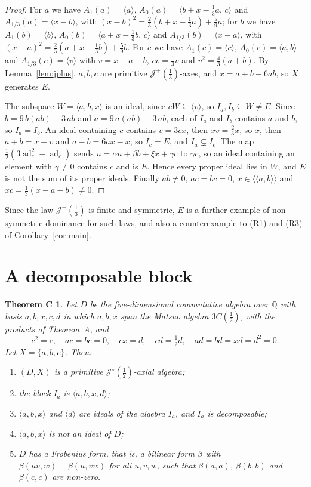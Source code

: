 \documentclass[11pt]{article}
\newif\ifwithC
\newtheorem*{thmC}{Theorem C}
\theoremstyle{definition}
\theoremstyle{remark}
\newcommand{\Q}{\mathbb Q}
\newcommand{\cJ}{\mathcal J}
\newcommand{\Jp}{\cJ^{+}}
\newcommand{\Jo}{\cJ^{\circ}}
\newcommand{\lla}{\langle\!\langle}
\newcommand{\rra}{\rangle\!\rangle}
\newcommand{\ad}{\operatorname{ad}}
\newcommand{\half}{\tfrac12}
\newcommand{\third}{\tfrac13}
\begin{document}
\begin{proof}
For $a$ we have $A_1(a)=\langle a\rangle$, $A_0(a)=\langle
b+x-\third a,\,c\rangle$ and $A_{1/3}(a)=\langle x-b\rangle$, with
$(x-b)^2=\frac23(b+x-\third a)+\frac59a$; for $b$ we have
$A_1(b)=\langle b\rangle$, $A_0(b)=\langle a+x-\third b,\,c\rangle$ and
$A_{1/3}(b)=\langle x-a\rangle$, with
$(x-a)^2=\frac23(a+x-\third b)+\frac59b$. For $c$ we have $A_1(c)=\langle c\rangle$,
$A_0(c)=\langle a,b\rangle$ and $A_{1/3}(c)=\langle v\rangle$ with
$v=x-a-b$, $cv=\third v$ and $v^2=\frac43(a+b)$. By Lemma~\ref{lem:jplus},
$a,b,c$ are primitive $\Jp(\third)$-axes, and $x=a+b-6ab$, so $X$ generates
$E$.

The subspace $W=\langle a,b,x\rangle$ is an ideal, since $cW\subseteq\langle
v\rangle$, so $I_a,I_b\subseteq W\ne E$. Since $b=9\,b(ab)-3\,ab$ and
$a=9\,a(ab)-3\,ab$, each of $I_a$ and $I_b$ contains $a$ and $b$, so
$I_a=I_b$. An ideal containing $c$ contains $v=3cx$, then $xv=\frac23x$, so
$x$, then $a+b=x-v$ and $a-b=6ax-x$; so $I_c=E$, and $I_a\subsetneq I_c$.
The map $\frac12(3\ad_c^2-\ad_c)$ sends $u=\alpha a+\beta b+\xi x+\gamma c$ to
$\gamma c$, so an ideal containing an element with $\gamma\ne0$ contains
$c$ and is $E$. Hence every proper ideal lies in $W$, and $E$ is not the sum
of its proper ideals. Finally $ab\ne0$, $ac=bc=0$, $x\in\lla a,b\rra$ and
$xc=\third(x-a-b)\ne0$.
\end{proof}

Since the law $\Jp(\third)$ is finite and symmetric, $E$ is a further
example of non-symmetric dominance for such laws, and also a counterexample to
(R1) and (R3) of Corollary~\ref{cor:main}.
\fi

\ifwithC
\section{A decomposable block}\label{sec:block}

\begin{thmC}
Let $D$ be the five-dimensional commutative algebra over $\Q$ with basis
$a,b,x,c,d$ in which $a,b,x$ span the Matsuo algebra $3C(\half)$, with the
products of Theorem~A, and
\[
c^2=c,\quad ac=bc=0,\quad cx=d,\quad cd=\tfrac12d,\quad ad=bd=xd=d^2=0 .
\]
Let $X=\{a,b,c\}$. Then:
\begin{enumerate}\setlength{\itemsep}{0pt}
\item[(a)] $(D,X)$ is a primitive $\Jo(\half)$-axial algebra;
\item[(b)] the block $I_a$ is $\langle a,b,x,d\rangle$;
\item[(c)] $\langle a,b,x\rangle$ and $\langle d\rangle$ are ideals of the
 algebra $I_a$, and $I_a$ is decomposable;
\item[(d)] $\langle a,b,x\rangle$ is not an ideal of $D$;
\item[(e)] $D$ has a Frobenius form, that is, a bilinear form $\beta$ with
 $\beta(uv,w)=\beta(u,vw)$ for all $u,v,w$, such that $\beta(a,a)$,
 $\beta(b,b)$ and $\beta(c,c)$ are non-zero.
\end{enumerate}
\end{thmC}
\end{document}
